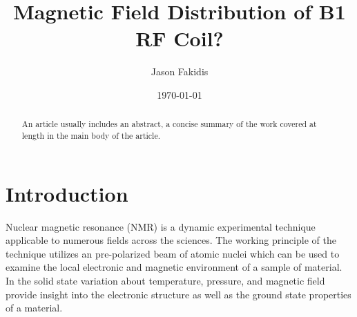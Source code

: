 \documentclass[%
 reprint,
 amsmath,
 amssymb,
 aps,
]{revtex4-1}
\begin{document}
\title{Magnetic Field Distribution of B1 RF Coil?}%

	\author{Jason Fakidis}
	
	
	\date{\today}%
	
	\begin{abstract}
	An article usually includes an abstract, a concise summary of the work
	covered at length in the main body of the article. 
	\end{abstract}
	
	\maketitle

\setlength{\parindent}{4ex}

\section{\label{sec:level1}Introduction}
	


	

	Nuclear magnetic resonance (NMR) is a dynamic experimental technique applicable to numerous fields across the sciences. The working principle of the technique utilizes an pre-polarized beam of atomic nuclei which can be used to examine the local electronic and magnetic environment of a sample of material. In the solid state variation about temperature, pressure, and magnetic field provide insight into the electronic structure as well as the ground state properties of a material.
	
\end{document}
